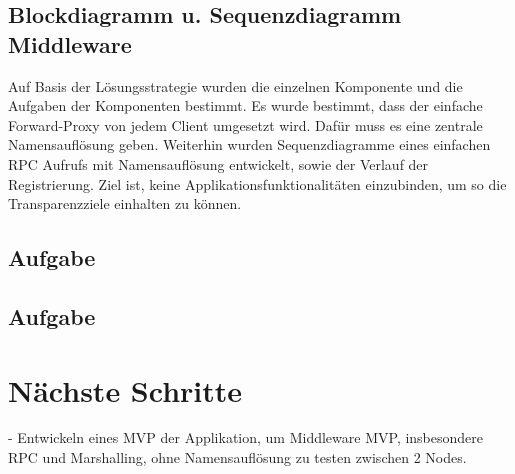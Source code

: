 \documentclass{article}
\begin{document}
\subsection{Blockdiagramm u. Sequenzdiagramm Middleware}
Auf Basis der Lösungsstrategie wurden die einzelnen Komponente und die Aufgaben der Komponenten bestimmt. Es wurde bestimmt, dass der einfache Forward-Proxy von jedem Client umgesetzt wird. Dafür muss es eine zentrale Namensauflösung geben. Weiterhin wurden Sequenzdiagramme eines einfachen RPC Aufrufs mit Namensauflösung entwickelt, sowie der Verlauf der Registrierung. Ziel ist, keine Applikationsfunktionalitäten einzubinden, um so die Transparenzziele einhalten zu können.


\subsection{Aufgabe}


\subsection{Aufgabe}



\section{Nächste Schritte}
- Entwickeln eines MVP der Applikation, um Middleware MVP, insbesondere RPC und Marshalling, ohne Namensauflösung zu testen zwischen 2 Nodes.
\end{document}
